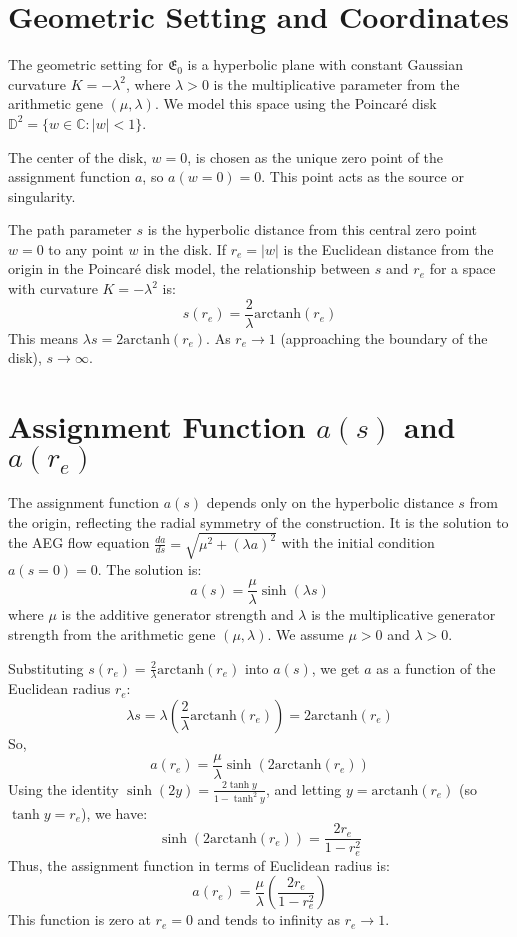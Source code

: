 \documentclass{article}
\begin{document}
\section{Geometric Setting and Coordinates}

The geometric setting for $\mathfrak{E}_0$ is a hyperbolic plane with constant Gaussian curvature $K = -\lambda^2$, where $\lambda > 0$ is the multiplicative parameter from the arithmetic gene $(\mu, \lambda)$. We model this space using the Poincaré disk $\mathbb{D}^2 = \{w \in \mathbb{C} : |w| < 1 \}$.

The center of the disk, $w=0$, is chosen as the unique zero point of the assignment function $a$, so $a(w=0)=0$. This point acts as the source or singularity.

The path parameter $s$ is the hyperbolic distance from this central zero point $w=0$ to any point $w$ in the disk. If $r_e = |w|$ is the Euclidean distance from the origin in the Poincaré disk model, the relationship between $s$ and $r_e$ for a space with curvature $K = -\lambda^2$ is:
$$ s(r_e) = \frac{2}{\lambda} \text{arctanh}(r_e) $$
This means $\lambda s = 2 \text{arctanh}(r_e)$. As $r_e \to 1$ (approaching the boundary of the disk), $s \to \infty$.

\section{Assignment Function $a(s)$ and $a(r_e)$}

The assignment function $a(s)$ depends only on the hyperbolic distance $s$ from the origin, reflecting the radial symmetry of the construction. It is the solution to the AEG flow equation $\frac{da}{ds} = \sqrt{\mu^2 + (\lambda a)^2}$ with the initial condition $a(s=0)=0$.
The solution is:
$$ a(s) = \frac{\mu}{\lambda} \sinh(\lambda s) $$
where $\mu$ is the additive generator strength and $\lambda$ is the multiplicative generator strength from the arithmetic gene $(\mu, \lambda)$. We assume $\mu > 0$ and $\lambda > 0$.

Substituting $s(r_e) = \frac{2}{\lambda} \text{arctanh}(r_e)$ into $a(s)$, we get $a$ as a function of the Euclidean radius $r_e$:
$$ \lambda s = \lambda \left( \frac{2}{\lambda} \text{arctanh}(r_e) \right) = 2 \text{arctanh}(r_e) $$
So,
$$ a(r_e) = \frac{\mu}{\lambda} \sinh(2 \text{arctanh}(r_e)) $$
Using the identity $\sinh(2y) = \frac{2\tanh y}{1-\tanh^2 y}$, and letting $y = \text{arctanh}(r_e)$ (so $\tanh y = r_e$), we have:
$$ \sinh(2 \text{arctanh}(r_e)) = \frac{2r_e}{1-r_e^2} $$
Thus, the assignment function in terms of Euclidean radius is:
$$ a(r_e) = \frac{\mu}{\lambda} \left( \frac{2r_e}{1-r_e^2} \right) $$
This function is zero at $r_e=0$ and tends to infinity as $r_e \to 1$.
\end{document}
